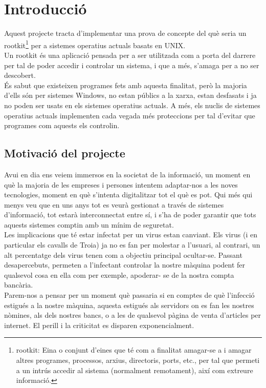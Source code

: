 \chapter{Introducció}

Aquest projecte tracta d'implementar una prova de concepte del què seria un rootkit\footnote{rootkit:
Eina o conjunt d'eines que té com a finalitat amagar-se a i amagar altres programes, processos, arxius, 
directoris, ports, etc., per tal que permeti a un intrús accedir al sistema (normalment remotament), 
així com extreure informació.} per a sistemes operatius actuals basats en UNIX.\\ 

Un rootkit és una aplicació pensada per a ser utilitzada com a porta del darrere per tal de
poder accedir i controlar un sistema, i que a més, s'amaga per a no ser descobert.\\

És sabut que existeixen programes fets amb aquesta finalitat, però la majoria d'ells són
per sistemes Windows, no estan públics a la xarxa, estan desfasats i ja no poden ser
usats en els sistemes operatius actuals. A més, els nuclis de sistemes operatius actuals implementen cada vegada més
proteccions per tal d'evitar que programes com aquests els controlin.

\section{Motivació del projecte}

Avui en dia ens veiem immersos en la societat de la informació, un moment en què la
majoria de les empreses i persones intentem adaptar-nos a les noves tecnologies,
moment en què s'intenta digitalitzar tot el què es pot. Qui més qui menys veu que en uns anys tot es veurà gestionat a través de sistemes
d'informació, tot estarà interconnectat entre sí, i s'ha de poder garantir que tots aquests
sistemes comptin amb un mínim de seguretat.\\


Les implicacions que té estar infectat per un virus estan canviant. Els virus (i en particular
els cavalls de Troia) ja no es fan per molestar a l'usuari, al contrari, un alt percentatge dels
virus tenen com a objectiu principal ocultar-se. Passant desapercebuts, permeten a l'infectant
controlar la nostre màquina podent fer qualsevol cosa en ella com per exemple, apoderar-
se de la nostra compta bancària.\\
Parem-nos a pensar per un moment què passaria si en comptes de què l'infecció estigués
a la nostre màquina, aquesta estigués als servidors on es fan les nostres nòmines, als dels
nostres bancs, o a les de qualsevol pàgina de venta d'articles per internet. El perill i la
criticitat es disparen exponencialment.\\


